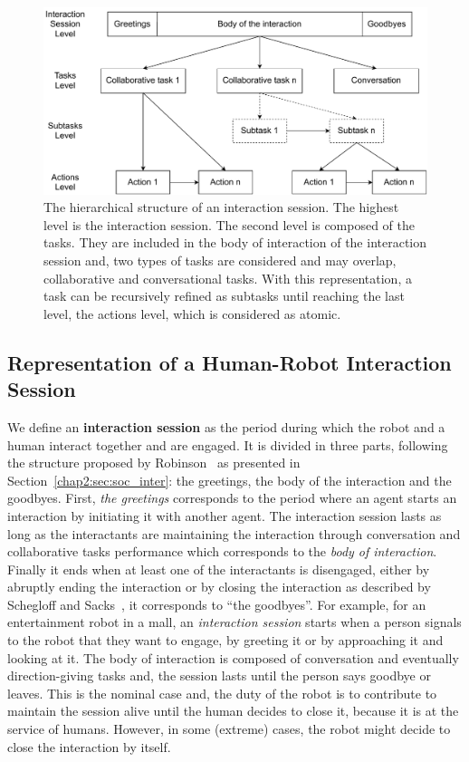 \documentclass[a4paper,11pt,twoside]{StyleThese}
\begin{document}
\begin{figure}[!ht]
	\centering
	\includegraphics[width=\linewidth]{figures/chapter2/session_interaction.pdf}
	\caption{The hierarchical structure of an interaction session. The highest level is the interaction session. The second level is composed of the tasks. They are included in the body of interaction of the interaction session and, two types of tasks are considered and may overlap, collaborative and conversational tasks. With this representation, a task can be recursively refined as subtasks until reaching the last level, the actions level, which is considered as atomic.
		}
	\label{fig:levels}
\end{figure}


\subsection{Representation of a Human-Robot Interaction Session}
We define an \textbf{interaction session} as the period during which the robot and a human interact together and are engaged. It is divided in three parts, following the structure proposed by Robinson~\cite{robinson_overall_2012} as presented in Section~\ref{chap2:sec:soc_inter}: the greetings, the body of the interaction and the goodbyes. First, \textit{the greetings} corresponds to the period where an agent starts an interaction by initiating it with another agent. The interaction session lasts as long as the interactants are maintaining the interaction through conversation and collaborative tasks performance which corresponds to the \textit{body of interaction}. Finally it ends when at least one of the interactants is disengaged, either by abruptly ending the interaction or by closing the interaction as described by Schegloff and Sacks~\cite{schegloff_1973_opening}, it corresponds to ``the goodbyes''. For example, for an entertainment robot in a mall, an \textit{interaction session} starts when a person signals to the robot that they want to engage, by greeting it or by approaching it and looking at it. The body of interaction is composed of conversation and eventually direction-giving tasks and, the session lasts until the person says goodbye or leaves. This is the nominal case and, the duty of the robot is to contribute to maintain the session alive until the human decides to close it, because it is at the service of humans. However, in some (extreme) cases, the robot might decide to close the interaction by itself.
\end{document}

